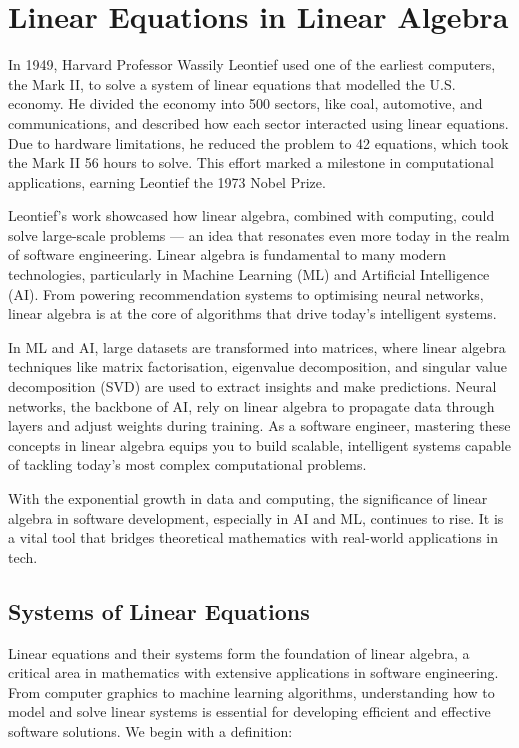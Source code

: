 \chapter{Linear Equations in Linear Algebra}\label{chap:ch7}

In 1949, Harvard Professor Wassily Leontief used one of the earliest computers, the Mark II, to solve a system of linear equations that modelled the U.S. economy. He divided the economy into 500 sectors, like coal, automotive, and communications, and described how each sector interacted using linear equations. Due to hardware limitations, he reduced the problem to 42 equations, which took the Mark II 56 hours to solve. This effort marked a milestone in computational applications, earning Leontief the 1973 Nobel Prize.

Leontief’s work showcased how linear algebra, combined with computing, could solve large-scale problems — an idea that resonates even more today in the realm of software engineering. Linear algebra is fundamental to many modern technologies, particularly in Machine Learning (ML) and Artificial Intelligence (AI). From powering recommendation systems to optimising neural networks, linear algebra is at the core of algorithms that drive today's intelligent systems.

In ML and AI, large datasets are transformed into matrices, where linear algebra techniques like matrix factorisation, eigenvalue decomposition, and singular value decomposition (SVD) are used to extract insights and make predictions. Neural networks, the backbone of AI, rely on linear algebra to propagate data through layers and adjust weights during training. As a software engineer, mastering these concepts in linear algebra equips you to build scalable, intelligent systems capable of tackling today’s most complex computational problems. 

With the exponential growth in data and computing, the significance of linear algebra in software development, especially in AI and ML, continues to rise. It is a vital tool that bridges theoretical mathematics with real-world applications in tech.

\section{Systems of Linear Equations}

Linear equations and their systems form the foundation of linear algebra, a critical area in mathematics with extensive applications in software engineering. From computer graphics to machine learning algorithms, understanding how to model and solve linear systems is essential for developing efficient and effective software solutions. We begin with a definition:

